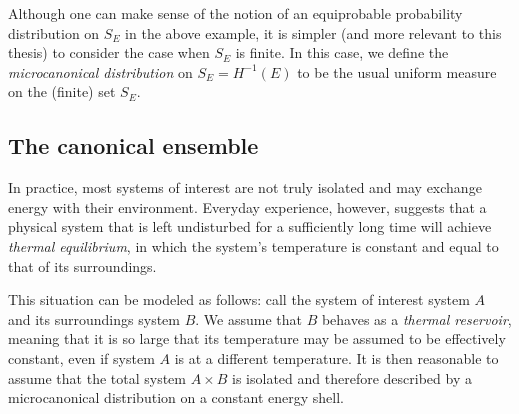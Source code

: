 Although one can make sense of the notion of an equiprobable probability distribution
on $S_E$ in the above example, it is simpler (and more relevant to this thesis) to
consider the case when $S_E$ is finite. In this case, we define the
\emph{microcanonical distribution} on $S_E = H^{-1}(E)$ to be the usual uniform
measure on the (finite) set $S_E$.


\subsection{The canonical ensemble}

In practice, most systems of interest are not truly isolated and may exchange
energy with
their environment. Everyday experience, however, suggests that
a physical system that is left undisturbed for a sufficiently long time will achieve
\emph{thermal equilibrium}, in which the system's
temperature is constant and equal to that of its surroundings.

This situation can be modeled as follows: call the system of interest system $A$ and
its surroundings system $B$. We assume that $B$ behaves as a \emph{thermal reservoir},
meaning that it is so large that its temperature may be assumed to be effectively
constant, even if system $A$ is at a different temperature.
It is then reasonable to assume that the total system $A \times B$
is isolated and therefore described by a microcanonical distribution on a constant energy shell.


